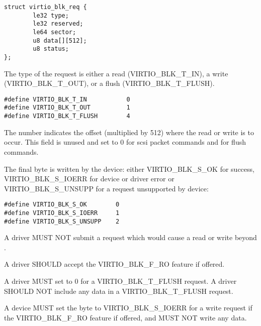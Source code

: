 \begin{lstlisting}
struct virtio_blk_req {
        le32 type;
        le32 reserved;
        le64 sector;
        u8 data[][512];
        u8 status;
};
\end{lstlisting}

The type of the request is either a read (VIRTIO_BLK_T_IN), a write
(VIRTIO_BLK_T_OUT), or a flush (VIRTIO_BLK_T_FLUSH).

\begin{lstlisting}
#define VIRTIO_BLK_T_IN           0
#define VIRTIO_BLK_T_OUT          1
#define VIRTIO_BLK_T_FLUSH        4
\end{lstlisting}

The  number indicates the offset (multiplied by 512) where
the read or write is to occur. This field is unused and set to 0
for scsi packet commands and for flush commands.

The final  byte is written by the device: either
VIRTIO_BLK_S_OK for success, VIRTIO_BLK_S_IOERR for device or driver
error or VIRTIO_BLK_S_UNSUPP for a request unsupported by device:

\begin{lstlisting}
#define VIRTIO_BLK_S_OK        0
#define VIRTIO_BLK_S_IOERR     1
#define VIRTIO_BLK_S_UNSUPP    2
\end{lstlisting}


A driver MUST NOT submit a request which would cause a read or write
beyond .

A driver SHOULD accept the VIRTIO_BLK_F_RO feature if offered.

A driver MUST set  to 0 for a VIRTIO_BLK_T_FLUSH request.
A driver SHOULD NOT include any data in a VIRTIO_BLK_T_FLUSH request.


A device MUST set the  byte to VIRTIO_BLK_S_IOERR
for a write request if the VIRTIO_BLK_F_RO feature if offered, and MUST NOT
write any data.


